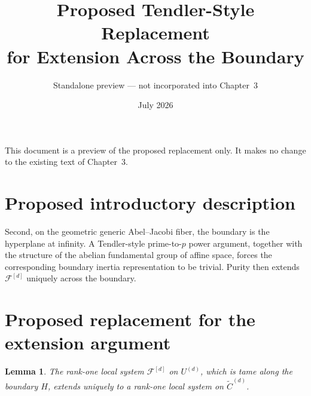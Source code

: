 \documentclass[11pt]{article}
\title{Proposed Tendler-Style Replacement\\for Extension Across the Boundary}
\author{Standalone preview --- not incorporated into Chapter~3}
\date{July 2026}
\newtheorem{lemma}{Lemma}
\theoremstyle{remark}
\newcommand{\F}{\mathcal F}
\begin{document}
\maketitle

\noindent
This document is a preview of the proposed replacement only.  It makes no
change to the existing text of Chapter~3.

\section*{Proposed introductory description}

Second, on the geometric generic Abel--Jacobi fiber, the boundary is the
hyperplane at infinity.  A Tendler-style prime-to-$p$ power argument,
together with the structure of the abelian fundamental group of affine
space, forces the corresponding boundary inertia representation to be
trivial.  Purity then extends $\F^{[d]}$ uniquely across the boundary.

\section*{Proposed replacement for the extension argument}

\begin{lemma}
The rank-one local system $\F^{[d]}$ on $U^{(d)}$, which is tame along the
boundary $H$, extends uniquely to a rank-one local system on
$\widetilde C^{(d)}$.
\end{lemma}
\end{document}
